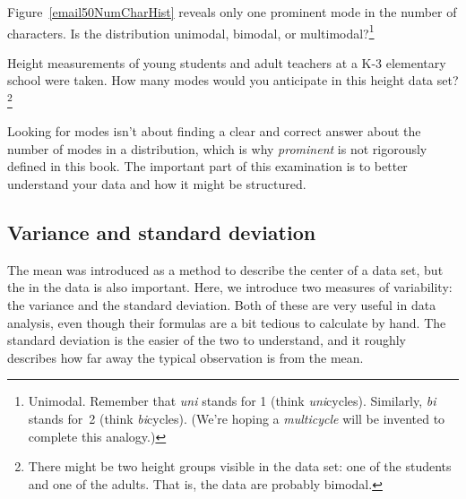 \begin{exercise}
Figure~\ref{email50NumCharHist} reveals only one prominent mode in the number of characters. Is the distribution unimodal, bimodal, or multimodal?\footnote{Unimodal. Remember that \emph{uni} stands for 1 (think \emph{uni}cycles). Similarly, \emph{bi} stands for~2 (think \emph{bi}cycles). (We're hoping a \emph{multicycle} will be invented to complete this analogy.)}
\end{exercise}

\begin{exercise}
Height measurements of young students and adult teachers at a K-3 elementary school were taken. How many modes would you anticipate in this height data set?\footnote{There might be two height groups visible in the data set: one of the students and one of the adults. That is, the data are probably bimodal.}
\end{exercise}

\begin{tipBox}{
Looking for modes isn't about finding a clear and correct answer about the number of modes in a distribution, which is why \emph{prominent} is not rigorously defined in this book. The important part of this examination is to better understand your data and how it might be structured.}
\end{tipBox}


\subsection{Variance and standard deviation}
\label{variability}

The mean was introduced as a method to describe the center of a data set, but the  in the data is also important. Here, we introduce two measures of variability: the variance and the standard deviation. Both of these are very useful in data analysis, even though their formulas are a bit tedious to calculate by hand. The standard deviation is the easier of the two to understand, and it roughly describes how far away the typical observation is from the mean.

